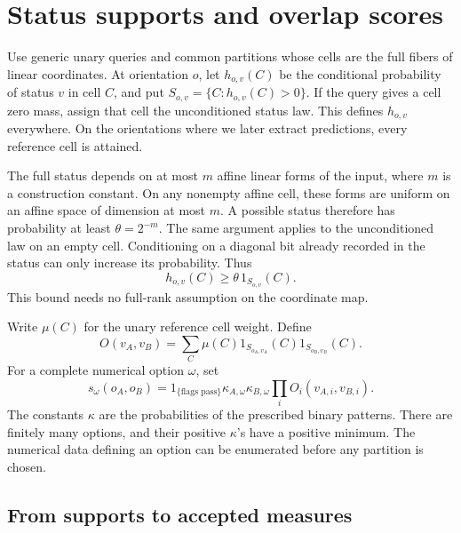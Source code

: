 \section{Status supports and overlap scores}\label{sec:finite-partitions}

Use generic unary queries and common partitions whose cells are the full
fibers of linear coordinates. At orientation \(o\), let \(h_{o,v}(C)\) be the conditional
probability of status \(v\) in cell \(C\), and put
\(S_{o,v}=\{C:h_{o,v}(C)>0\}\).
If the query gives a cell zero mass, assign that cell the unconditioned
status law. This defines \(h_{o,v}\) everywhere. On the orientations
where we later extract predictions, every reference cell is attained.

The full status depends on at most \(m\) affine linear forms of the input,
where \(m\) is a construction constant. On any nonempty affine cell,
these forms are uniform on an affine space of dimension at most \(m\).
A possible status therefore has probability at least \(\theta=2^{-m}\).
The same argument applies to the unconditioned law on an empty cell. Conditioning on a diagonal bit
already recorded in the status can only increase its probability.
Thus
\[
 h_{o,v}(C)\ge\theta\,1_{S_{o,v}}(C).
\]
This bound needs no full-rank assumption on the coordinate map.

Write \(\mu(C)\) for the unary reference cell weight. Define
\begin{equation}\label{eq:table-overlap}
 O(v_A,v_B)=\sum_C\mu(C)1_{S_{o_A,v_A}}(C)1_{S_{o_B,v_B}}(C).
\end{equation}
For a complete numerical option \(\omega\), set
\begin{equation}\label{eq:finite-score}
 s_\omega(o_A,o_B)=1_{\{\text{flags pass}\}}
       \kappa_{A,\omega}\kappa_{B,\omega}
       \prod_i O_i(v_{A,i},v_{B,i}).
\end{equation}
The constants \(\kappa\) are the probabilities of the prescribed binary
patterns. There are finitely many options, and their positive \(\kappa\)'s
have a positive minimum. The numerical data defining an option can be enumerated before any
partition is chosen.

\subsection{From supports to accepted measures}

